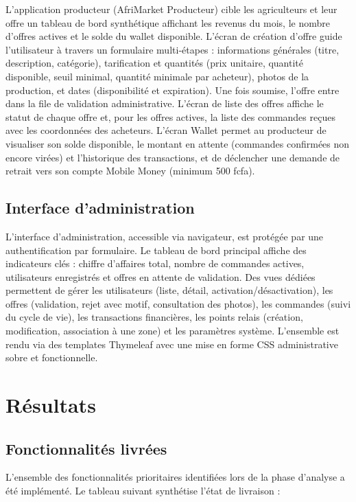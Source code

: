 \documentclass[12pt, a4paper, oneside]{report}
\begin{document}
L'application producteur (AfriMarket Producteur) cible les agriculteurs et leur offre
un tableau de bord synthétique affichant les revenus du mois, le nombre d'offres actives
et le solde du wallet disponible. L'écran de création d'offre guide l'utilisateur à travers
un formulaire multi-étapes : informations générales (titre, description, catégorie), tarification
et quantités (prix unitaire, quantité disponible, seuil minimal, quantité minimale par
acheteur), photos de la production, et dates (disponibilité et expiration). Une fois
soumise, l'offre entre dans la file de validation administrative. L'écran de liste des
offres affiche le statut de chaque offre et, pour les offres actives, la liste des
commandes reçues avec les coordonnées des acheteurs. L'écran Wallet permet au producteur
de visualiser son solde disponible, le montant en attente (commandes confirmées non encore
virées) et l'historique des transactions, et de déclencher une demande de retrait vers
son compte Mobile Money (minimum 500 \gls{fcfa}).

\subsection{Interface d'administration}

L'interface d'administration, accessible via navigateur, est protégée par une
authentification par formulaire. Le tableau de bord principal affiche des indicateurs
clés : chiffre d'affaires total, nombre de commandes actives, utilisateurs enregistrés et
offres en attente de validation. Des vues dédiées permettent de gérer les utilisateurs
(liste, détail, activation/désactivation), les offres (validation, rejet avec motif,
consultation des photos), les commandes (suivi du cycle de vie), les transactions
financières, les points relais (création, modification, association à une zone) et les
paramètres système. L'ensemble est rendu via des templates Thymeleaf avec une mise en
forme CSS administrative sobre et fonctionnelle.

\section{Résultats}

\subsection{Fonctionnalités livrées}

L'ensemble des fonctionnalités prioritaires identifiées lors de la phase d'analyse a été
implémenté. Le tableau suivant synthétise l'état de livraison :
\end{document}
